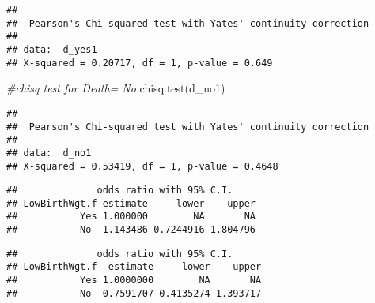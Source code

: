 \documentclass[
]{article}
\newenvironment{Shaded}{\begin{snugshade}}{\end{snugshade}}
\newcommand{\AttributeTok}[1]{\textcolor[rgb]{0.77,0.63,0.00}{#1}}
\newcommand{\CommentTok}[1]{\textcolor[rgb]{0.56,0.35,0.01}{\textit{#1}}}
\newcommand{\FunctionTok}[1]{\textcolor[rgb]{0.00,0.00,0.00}{#1}}
\newcommand{\NormalTok}[1]{#1}
\newcommand{\SpecialCharTok}[1]{\textcolor[rgb]{0.00,0.00,0.00}{#1}}
\newcommand{\StringTok}[1]{\textcolor[rgb]{0.31,0.60,0.02}{#1}}
\begin{document}
\begin{verbatim}
## 
##  Pearson's Chi-squared test with Yates' continuity correction
## 
## data:  d_yes1
## X-squared = 0.20717, df = 1, p-value = 0.649
\end{verbatim}

\begin{Shaded}
\begin{Highlighting}[]
\CommentTok{\#chisq test for Death= No}
\FunctionTok{chisq.test}\NormalTok{(d\_no1)}
\end{Highlighting}
\end{Shaded}

\begin{verbatim}
## 
##  Pearson's Chi-squared test with Yates' continuity correction
## 
## data:  d_no1
## X-squared = 0.53419, df = 1, p-value = 0.4648
\end{verbatim}

\begin{Shaded}
\end{Shaded}

\begin{verbatim}
##              odds ratio with 95% C.I.
## LowBirthWgt.f estimate     lower    upper
##           Yes 1.000000        NA       NA
##           No  1.143486 0.7244916 1.804796
\end{verbatim}

\begin{Shaded}
\end{Shaded}

\begin{verbatim}
##              odds ratio with 95% C.I.
## LowBirthWgt.f  estimate     lower    upper
##           Yes 1.0000000        NA       NA
##           No  0.7591707 0.4135274 1.393717
\end{verbatim}
\end{document}
